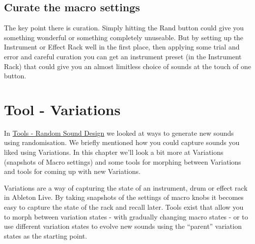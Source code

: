 \documentclass[
  12pt,
  letterpaper,
  oneside,
  open=any]{scrbook}
\begin{document}
\section{Curate the macro settings}\label{curate-the-macro-settings}

The key point there is curation. Simply hitting the Rand button could
give you something wonderful or something completely unuseable. But by
setting up the Instrument or Effect Rack well in the first place, then
applying some trial and error and careful curation you can get an
instrument preset (in the Instrument Rack) that could give you an almost
limitless choice of sounds at the touch of one button.


\chapter{Tool - Variations}\label{Chapter-025-Tool-Variations}

In \hyperref[Chapter-024-Tool-Random_Sound_Design]{Tools - Random Sound
Design} we looked at ways to generate new sounds using randomisation. We
briefly mentioned how you could capture sounds you liked using
Variations. In this chapter we'll look a bit more at Variations
(snapshots of Macro settings) and some tools for morphing between
Variations and tools for coming up with new Variations.

\begin{tcolorbox}[enhanced jigsaw, titlerule=0mm, toprule=.15mm, bottomrule=.15mm, colframe=quarto-callout-tip-color-frame, bottomtitle=1mm, opacityback=0, breakable, leftrule=.75mm, coltitle=black, colback=white, rightrule=.15mm, arc=.35mm, toptitle=1mm, title=\textcolor{quarto-callout-tip-color}{\faLightbulb}\hspace{0.5em}{Key idea}, opacitybacktitle=0.6, left=2mm, colbacktitle=quarto-callout-tip-color!10!white]

Variations are a way of capturing the state of an instrument, drum or
effect rack in Ableton Live. By taking snapshots of the settings of
macro knobs it becomes easy to capture the state of the rack and recall
later. Tools exist that allow you to morph between variation states -
with gradually changing macro states - or to use different variation
states to evolve new sounds using the ``parent'' variation states as the
starting point.

\end{tcolorbox}
\end{document}
